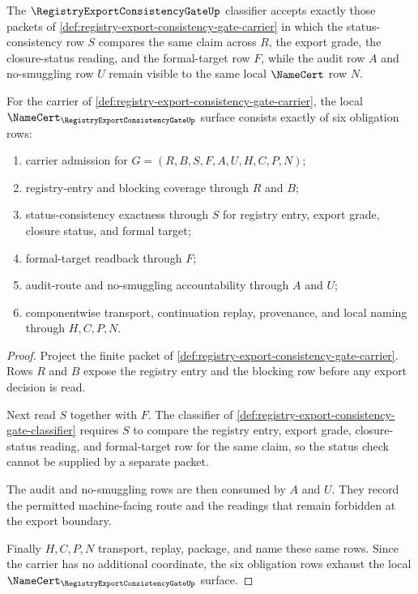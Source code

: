 \begin{definition}
\label{def:registry-export-consistency-gate-classifier}
The $\RegistryExportConsistencyGateUp$ classifier accepts exactly those packets of \autoref{def:registry-export-consistency-gate-carrier} in which the status-consistency row $S$ compares the same claim across $R$, the export grade, the closure-status reading, and the formal-target row $F$, while the audit row $A$ and no-smuggling row $U$ remain visible to the same local $\NameCert$ row $N$.
\end{definition}

\begin{theorem}
\label{thm:registry-export-consistency-gate-namecert-obligations}
For the carrier of \autoref{def:registry-export-consistency-gate-carrier}, the local $\NameCert_{\RegistryExportConsistencyGateUp}$ surface consists exactly of six obligation rows:
\begin{enumerate}
\item carrier admission for $G=(R,B,S,F,A,U,H,C,P,N)$;
\item registry-entry and blocking coverage through $R$ and $B$;
\item status-consistency exactness through $S$ for registry entry, export grade, closure status, and formal target;
\item formal-target readback through $F$;
\item audit-route and no-smuggling accountability through $A$ and $U$;
\item componentwise transport, continuation replay, provenance, and local naming through $H,C,P,N$.
\end{enumerate}
\end{theorem}
\begin{proof}
Project the finite packet of \autoref{def:registry-export-consistency-gate-carrier}. Rows $R$ and $B$ expose the registry entry and the blocking row before any export decision is read.

Next read $S$ together with $F$. The classifier of \autoref{def:registry-export-consistency-gate-classifier} requires $S$ to compare the registry entry, export grade, closure-status reading, and formal-target row for the same claim, so the status check cannot be supplied by a separate packet.

The audit and no-smuggling rows are then consumed by $A$ and $U$. They record the permitted machine-facing route and the readings that remain forbidden at the export boundary.

Finally $H,C,P,N$ transport, replay, package, and name these same rows. Since the carrier has no additional coordinate, the six obligation rows exhaust the local $\NameCert_{\RegistryExportConsistencyGateUp}$ surface.
\end{proof}

